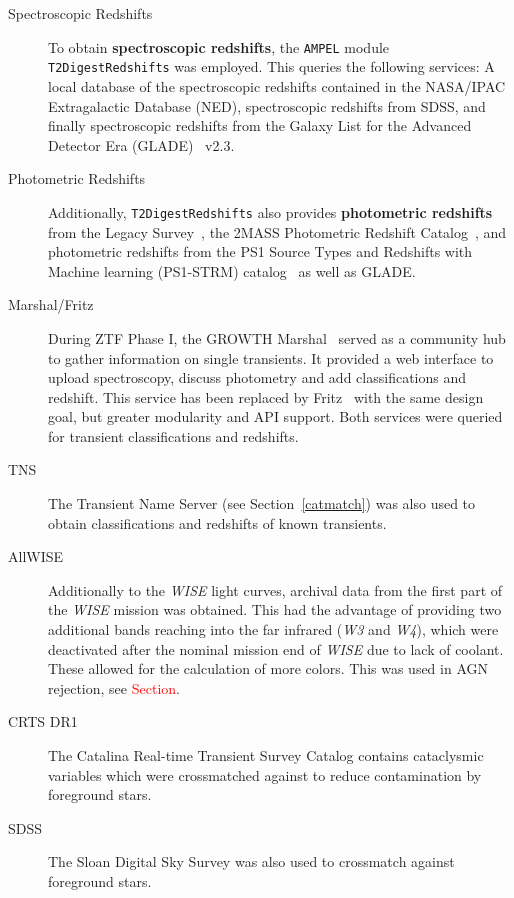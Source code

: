 \begin{description}
    \item[Spectroscopic Redshifts] To obtain \textbf{spectroscopic redshifts}, the \texttt{AMPEL} module \texttt{T2DigestRedshifts} was employed. This queries the following services: A local database of the spectroscopic redshifts contained in the NASA/IPAC Extragalactic Database (NED), spectroscopic redshifts from SDSS, and finally spectroscopic redshifts from the Galaxy List for the Advanced Detector Era (GLADE)~ v2.3.
    \item[Photometric Redshifts] Additionally, \texttt{T2DigestRedshifts} also provides \textbf{photometric redshifts} from the Legacy Survey~, the 2MASS Photometric Redshift Catalog~, and photometric redshifts from the PS1 Source Types and Redshifts with Machine learning (PS1-STRM) catalog~ as well as GLADE.
    \item[Marshal/Fritz] During ZTF Phase I, the GROWTH Marshal~ served as a community hub to gather information on single transients. It provided a web interface to upload spectroscopy, discuss photometry and add classifications and redshift. This service has been replaced by Fritz~ with the same design goal, but greater modularity and API support. Both services were queried for transient classifications and redshifts.
    \item[TNS] The Transient Name Server (see Section~\ref{catmatch}) was also used to obtain classifications and redshifts of known transients.
    \item[AllWISE] Additionally to the \textit{WISE} light curves, archival data from the first part of the \textit{WISE} mission was obtained. This had the advantage of providing two additional bands reaching into the far infrared (\textit{W3} and \textit{W4}), which were deactivated after the nominal mission end of \textit{WISE} due to lack of coolant. These allowed for the calculation of more colors. This was used in AGN rejection, see \textcolor{red}{Section}.
    \item[CRTS DR1] The Catalina Real-time Transient Survey Catalog contains cataclysmic variables which were crossmatched against to reduce contamination by foreground stars.
    \item[SDSS] The Sloan Digital Sky Survey was also used to crossmatch against foreground stars.
\end{description}

